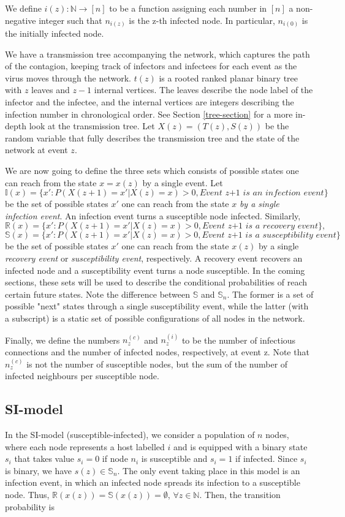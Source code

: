 \documentclass[12pt]{article} %
\numberwithin{equation}{section}
\begin{document}
We define $i(z): \mathbb{N} \rightarrow [n]$ to be a function assigning each number in $[n]$ a non-negative integer such that $n_{i(z)}$ is the z-th infected node. In particular, $n_{i(0)}$ is the initially infected node.

We have a transmission tree accompanying the network, which captures the path of the contagion, keeping track of infectors and infectees for each event as the virus moves through the network. $t(z)$ is a rooted ranked planar binary tree with $z$ leaves and $z-1$ internal vertices. The leaves describe the node label of the infector and the infectee, and the internal vertices are integers describing the infection number in chronological order. See Section \ref{tree-section} for a more in-depth look at the transmission tree. Let $X(z) = (T(z),S(z))$ be the random variable that fully describes the transmission tree and the state of the network at event $z$. 

We are now going to define the three sets which consists of possible states one can reach from the state $x = x(z)$ by a single event.
Let $$\mathbb{I}(x) = \{x': P(X(z+1) = x' | X(z) = x) > 0, \textit{Event z+1 is an infection event}\}$$ be the set of possible states $x'$ one can reach from the state $x$ \textit{by a single infection event}. An infection event turns a susceptible node infected. Similarly, 
$$\mathbb{R}(x) = \{x': P(X(z+1) = x' | X(z) = x) > 0, \textit{Event z+1 is a recovery event}\},$$
$$\mathbb{S}(x) = \{x': P(X(z+1) = x' | X(z) = x) > 0, \textit{Event z+1 is a susceptibility event}\}$$
be the set of possible states $x'$ one can reach from the state $x(z)$ by a single \textit{recovery event} or \textit{susceptibility event}, respectively. A recovery event recovers an infected node and a susceptibility event turns a node susceptible. In the coming sections, these sets will be used to describe the conditional probabilities of reach certain future states. Note the difference between $\mathbb{S}$ and $\mathbb{S}_n$. The former is a set of possible "next" states through a single susceptibility event, while the latter (with a subscript) is a static set of possible configurations of all nodes in the network. 

Finally, we define the numbers $n^{(c)}_z$ and $n^{(i)}_z$ to be the number of infectious connections and the number of infected nodes, respectively, at event z. Note that $n^{(c)}_z$ is not the number of susceptible nodes, but the sum of the number of infected neighbours per susceptible node.


\subsection{SI-model}\label{si-model-section}
In the SI-model (susceptible-infected), we consider a population of $n$ nodes, where each node represents a host labelled $i$ and is equipped with a binary state $s_i$ that takes value $s_i = 0$ if node $n_i$ is susceptible and $s_i = 1$ if infected. Since $s_i$ is binary, we have $s(z) \in \mathbb{S}_n$. The only event taking place in this model is an infection event, in which an infected node spreads its infection to a susceptible node. Thus, $\mathbb{R}(x(z))=\mathbb{S}(x(z)) = \emptyset$, $\forall z\in \mathbb{N}$.
Then, the transition probability is 
\end{document}
